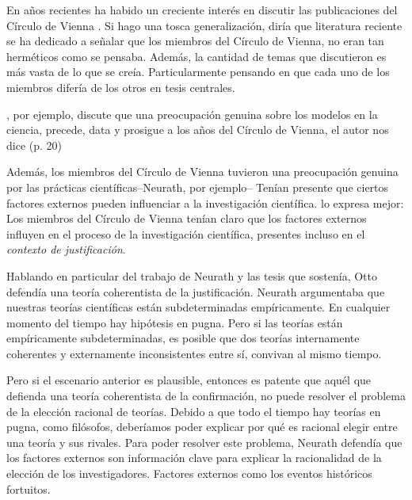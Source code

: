 \noindent En años recientes ha habido un creciente interés en discutir las publicaciones del Círculo de Vienna \parencite{Bentley2023, Richardson2023, Suarez2024, Riel2014}.
Si hago una tosca generalización, diría que literatura reciente se ha dedicado a señalar que los miembros del Círculo de Vienna, no eran tan herméticos como se pensaba.
Además, la cantidad de temas que discutieron es más vasta de lo que se creía.
Particularmente pensando en que cada uno de los miembros difería de los otros en tesis centrales.

\textcite{Suarez2024}, por ejemplo, discute que una preocupación genuina sobre los modelos en la ciencia, precede, data y prosigue a los años del Círculo de Vienna, el autor nos dice  (p. 20)

Además, los miembros del Círculo de Vienna tuvieron una preocupación genuina por las prácticas científicas--Neurath, por ejemplo--
Tenían presente que ciertos factores externos pueden influenciar a la investigación científica.
\textcite[p. 24]{Bentley2023} lo expresa mejor: 
Los miembros del Círculo de Vienna tenían claro que los factores externos influyen en el proceso de la investigación científica, presentes incluso en el \emph{contexto de justificación}.

Hablando en particular del trabajo de Neurath y las tesis que sostenía, Otto defendía una teoría coherentista de la justificación.
Neurath argumentaba que nuestras teorías científicas están subdeterminadas empíricamente.
En cualquier momento del tiempo hay hipótesis en pugna.
Pero si las teorías están empíricamente subdeterminadas, es posible que dos teorías internamente coherentes y externamente inconsistentes entre sí, convivan al mismo tiempo.

Pero si el escenario anterior es plausible, entonces es patente que aquél que defienda una teoría coherentista de la confirmación, no puede resolver el problema de la elección racional de teorías.
Debido a que todo el tiempo hay teorías en pugna, como filósofos, deberíamos poder explicar por qué es racional elegir entre una teoría y sus rivales. Para poder resolver este problema, Neurath defendía que los factores externos son información clave para explicar la racionalidad de la elección de los investigadores.
Factores externos como los eventos históricos fortuitos.

